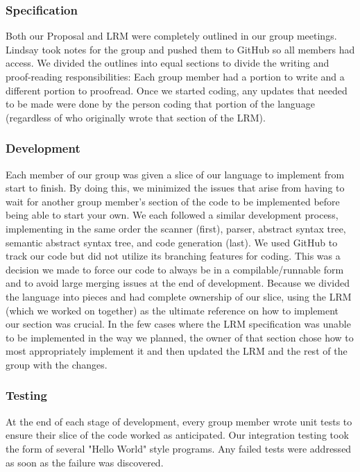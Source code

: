 		\subsubsection{Specification}
		Both our Proposal and LRM were completely outlined in our group meetings. Lindsay took notes for the group and pushed them to GitHub so all members had access.  We divided the outlines into equal sections to divide the writing and proof-reading responsibilities: Each group member had a portion to write and a different portion to proofread. Once we started coding, any updates that needed to be made were done by the person coding that portion of the language (regardless of who originally wrote that section of the LRM). 
		
		\subsubsection{Development}
		Each member of our group was given a slice of our language to implement from start to finish. By doing this, we minimized the issues that arise from having to wait for another group member's section of the code to be implemented before being able to start your own. We each followed a similar development process, implementing in the same order the scanner (first), parser, abstract syntax tree, semantic abstract syntax tree, and code generation (last). We used GitHub to track our code but did not utilize its branching features for coding. This was a decision we made to force our code to always be in a compilable/runnable form and to avoid large merging issues at the end of development. Because we divided the language into pieces and had complete ownership of our slice, using the LRM (which we worked on together) as the ultimate reference on how to implement our section was crucial. In the few cases where the LRM specification was unable to be implemented in the way we planned, the owner of that section chose how to most appropriately implement it and then updated the LRM and the rest of the group with the changes.
		
		\subsubsection{Testing}
		At the end of each stage of development, every group member wrote unit tests to ensure their slice of the code worked as anticipated. Our integration testing took the form of several "Hello World" style programs. Any failed tests were addressed as soon as the failure was discovered.
		
